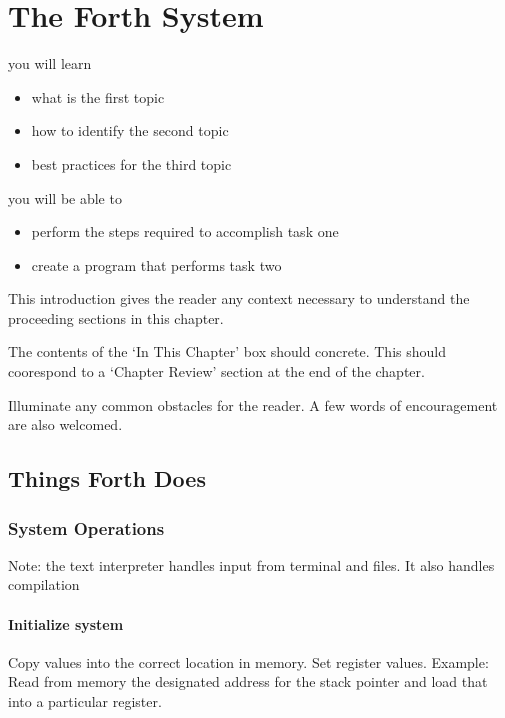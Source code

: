 \setchapterpreamble[u]{\margintoc}
\chapter{The Forth System}

%
\begin{kaobox}[frametitle=In This Chapter]
you will learn
\begin{itemize}
	\item what is the first topic
	\item how to identify the second topic
        \item best practices for the third topic
\end{itemize}

you will be able to
\begin{itemize}
        \item perform the steps required to accomplish task one
        \item create a program that performs task two
\end{itemize}
\end{kaobox}

This introduction gives the reader any context necessary to understand the 
proceeding sections in this chapter.

The contents of the `In This Chapter' box should concrete. This should coorespond to
a `Chapter Review' section at the end of the chapter.

Illuminate any common obstacles for the reader. A few words of encouragement are also welcomed.

%
\section{Things Forth Does}
\subsection{System Operations}
Note: the text interpreter handles input from terminal and files. It also 
handles compilation

\subsubsection{Initialize system}
Copy values into the correct location in memory. Set register values. Example: 
Read from memory the designated address for the stack pointer and load that 
into a particular register.

